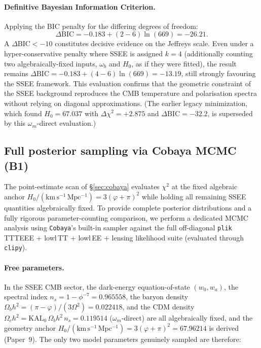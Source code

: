 \documentclass[12pt,a4paper]{article}
\begin{document}
\paragraph{Definitive Bayesian Information Criterion.}
Applying the BIC penalty for the differing degrees of freedom:
\begin{equation}
    \label{eq:bic_cobaya}
    \Delta\mathrm{BIC} = -0.183 + (2 - 6)\ln(669) = -26.21.
\end{equation}
A $\Delta\mathrm{BIC} < -10$ constitutes decisive evidence on the Jeffreys scale. Even under a hyper-conservative penalty where SSEE is assigned $k=4$ (additionally counting two algebraically-fixed inputs, $\omega_b$ and $H_0$, as if they were fitted), the result remains $\Delta\mathrm{BIC} = -0.183 + (4-6)\ln(669) = -13.19$, still strongly favouring the SSEE framework. This evaluation confirms that the geometric constraint of the SSEE background reproduces the CMB temperature and polarisation spectra without relying on diagonal approximations. (The earlier legacy minimization, which found $H_0=67.037$ with $\Delta\chi^2=+2.875$ and $\Delta\mathrm{BIC}=-32.2$, is superseded by this $\omega_m$-direct evaluation.)

\subsection{Full posterior sampling via Cobaya MCMC (B1)}
\label{sec:b1_mcmc}

The point-estimate scan of \S\ref{sec:cobaya} evaluates $\chi^2$ at the fixed algebraic anchor $H_0/(\mathrm{km\,s^{-1}\,Mpc^{-1}}) = 3(\varphi+\pi)^2$ while holding all remaining SSEE quantities algebraically fixed. To provide complete posterior distributions and a fully rigorous parameter-counting comparison, we perform a dedicated MCMC analysis using \texttt{Cobaya}'s built-in sampler against the full off-diagonal \texttt{plik} TTTEEE + lowl\,TT + lowl\,EE + lensing likelihood suite (evaluated through \texttt{clipy}).

\paragraph{Free parameters.}
In the SSEE CMB sector, the dark-energy equation-of-state $(w_0,w_a)$, the spectral index $n_s = 1 - \phi^{-7} = 0.965558$, the baryon density $\Omega_b h^2 = (\pi-\varphi)/(3\Omega^2) = 0.022418$, and the CDM density $\Omega_c h^2 = \mathrm{KAL}_0\,\Omega_b h^2\,n_s = 0.119514$ ($\omega_m$-direct) are all algebraically fixed, and the geometry anchor $H_0/(\mathrm{km\,s^{-1}\,Mpc^{-1}}) = 3(\varphi+\pi)^2 = 67.96214$ is derived (Paper~9). The only two model parameters genuinely sampled are therefore:
\end{document}
